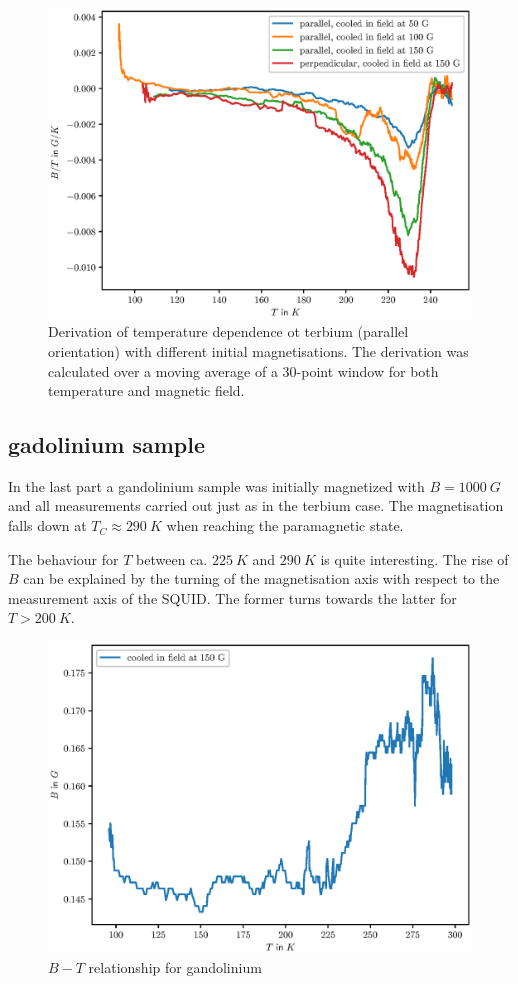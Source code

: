 \documentclass[paper=a4, fontsize=10pt]{scrartcl}
\begin{document}
\begin{figure}
  \centering
  \includegraphics{plots/2_derivation}
  \caption{Derivation of temperature dependence ot terbium (parallel
    orientation) with different initial magnetisations. The derivation
    was calculated over a moving average of a 30-point window for both
    temperature and magnetic field.}
  \label{fig:terbium_derivation}
\end{figure}

\subsection{gadolinium sample}

In the last part a gandolinium sample was initially magnetized with
$B = \SI{1000}{G}$ and all measurements carried out just as in the
terbium case. The magnetisation falls down at
$T_{C} \approx \SI{290}{K}$ when reaching the paramagnetic state.

The behaviour for $T$ between ca. $\SI{225}{K}$ and $\SI{290}{K}$ is
quite interesting. The rise of $B$ can be explained by the turning of
the magnetisation axis with respect to the measurement axis of the
SQUID. The former turns towards the latter for $T > \SI{200}{K}$.


\begin{figure}
  \centering
  \includegraphics{plots/3_gandolinium}
  \caption{$B-T$ relationship for gandolinium}
  \label{fig:terbium_derivation}
\end{figure}
\end{document}
